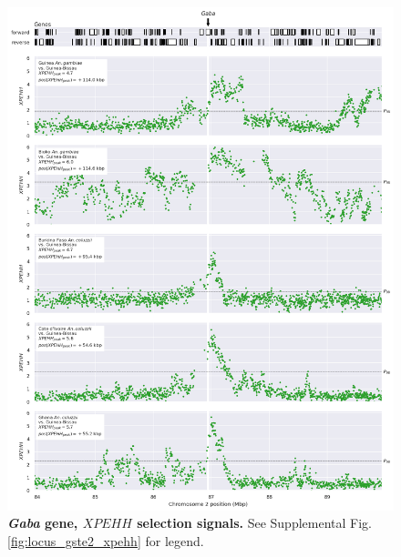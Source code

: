 \documentclass[a4paper,11pt,abstracton,hidelinks]{scrartcl}
\begin{document}
\begin{figure}[t!]
	\begin{center}
		\includegraphics*[width=1\linewidth,center]{artwork/locus_gaba_xpehh_pdist.png}
	\end{center}
	\caption[\textit{Gaba} gene, $XPEHH$ selection signals]{
	\textbf{\textit{Gaba} gene, $XPEHH$ selection signals.}
	See Supplemental Fig. \ref{fig:locus_gste2_xpehh} for legend.
	} 
	\label{fig:locus_gaba_xpehh}
\end{figure}


\clearpage
\end{document}
